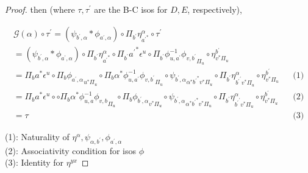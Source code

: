 \documentclass[10pt, oneside]{article}
\begin{document}
\begin{proof}
\noindent then (where $\tau, \tau^\prime$ are the B-C isos for $D ,E$, respectively),

\begin{align*}
    \mathcal{G}(\alpha) \circ \tau^\prime = (\psi_{b^\prime, \alpha} \ast \phi_{a^\prime, \alpha}) \circ \Pi_{b^\prime} \eta^{\alpha}_{{a^\prime}^\ast} \circ \tau^\prime
    \\ = (\psi_{b^\prime, \alpha} \ast \phi_{a^\prime, \alpha}) \circ \Pi_{b^\prime} \eta^{\alpha}_{{a^\prime}^\ast} \circ \Pi_{b^\prime}{a^\prime}^{\ast} \epsilon^u \circ \Pi_{b^\prime} {\phi^{-1}_{u, a^\prime} \phi_{v, b^\prime}}_{\Pi_u} \circ \eta^{b^\prime}_{v^\ast \Pi_u}
    \\ = \Pi_{b}{a}^{\ast} \epsilon^u \circ \Pi_b {\phi_{a^\prime, \alpha}}_{u^\ast \Pi_u} \circ \Pi_{b} \alpha^\ast {\phi^{-1}_{u, a^\prime} \phi_{v, b^\prime}}_{\Pi_u} \circ {\psi_{b^\prime, \alpha}}_{\alpha^\ast {b^\prime}^\ast v^\ast \Pi_{u}} \circ \Pi_{b^\prime} \eta^\alpha_{{b^\prime}^\prime v^\ast \Pi_{u}} \circ \eta^{b^\prime}_{v^\ast \Pi_u} && \text{(1)}
    \\ = \Pi_{b}{a}^{\ast} \epsilon^u \circ \circ \Pi_{b} \alpha^\ast {\phi^{-1}_{u, a} \phi_{v, b}}_{\Pi_u} \circ \Pi_b {\phi_{b^\prime, \alpha}}_{v^\ast \Pi_u} \circ {\psi_{b^\prime, \alpha}}_{\alpha^\ast {b^\prime}^\ast v^\ast \Pi_{u}} \circ \Pi_{b^\prime} \eta^\alpha_{{b^\prime}^\prime v^\ast \Pi_{u}} \circ \eta^{b^\prime}_{v^\ast \Pi_u} && \text{(2)}
    \\ = \tau && \text{(3)}
\end{align*}

\noindent
(1): Naturality of $\eta^\alpha, \psi_{\alpha, b^\prime}, \phi_{a^\prime, \alpha}$ \\
(2): Associativity condition for isos $\phi$ \\
(3): Identity for $\eta^{yx}$

\end{proof}
\end{document}
